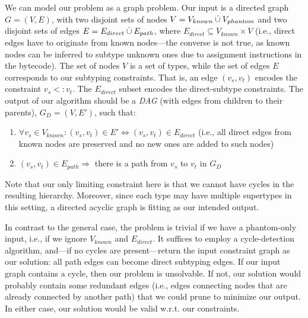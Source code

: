 We can model our problem as a graph problem. Our input is a directed
graph $G = (V,E)$, with two disjoint sets of nodes $V = V_{known} \mathbin{\dot{\cup}}
V_{phantom}$ and two disjoint sets of edges $E = E_{direct} \mathbin{\dot{\cup}}
E_{path}$, where $E_{direct} \subseteq V_{known} \times V$ (i.e.,
direct edges have to originate from known nodes---the converse is not
true, as known nodes can be inferred to subtype unknown ones due to
assignment instructions in the bytecode). The set of nodes $V$ is a
set of types, while the set of edges $E$ corresponds to our subtyping
constraints. That is, an edge $(v_s,v_t)$ encodes the constraint $v_s
<: v_t$. The $E_{direct}$ subset encodes the direct-subtype
constraints. The output of our algorithm should be a \emph{DAG} (with
edges from children to their parents), $G_D = (V,E')$, such that:
\begin{enumerate}
\item
  $\forall v_s \in V_{known}: (v_s,v_t) \in E' \Leftrightarrow (v_s,
  v_t) \in E_{direct}$ (i.e., all direct edges from known nodes are
  preserved and no new ones are added to such nodes)
\item $(v_s,v_t) \in E_{path} \Rightarrow$ there is a path from $v_s$
  to $v_t$ in $G_D$
\end{enumerate}


Note that our only limiting constraint here is that we cannot have
cycles in the resulting hierarchy. Moreover, since each type may have
multiple supertypes in this setting, a directed acyclic graph is
fitting as our intended output.


In contrast to the general case, the problem is trivial if we have a
phantom-only input, i.e., if we ignore $V_{known}$ and
$E_{direct}$. It suffices to employ a cycle-detection algorithm,
and---if no cycles are present---return the input constraint graph as
our solution: all path edges can become direct subtyping edges. If our
input graph contains a cycle, then our problem is unsolvable.  If
not, our solution would probably contain some redundant edges (i.e.,
edges connecting nodes that are already connected by another path)
that we could prune to minimize our output. In either case, our
solution would be valid w.r.t. our constraints.

